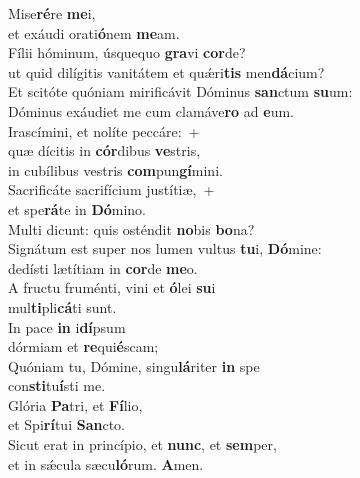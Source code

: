 \evenverse Mise\textbf{ré}re \textbf{me}i,~\*\\
\evenverse et exáudi orati\textbf{ó}nem \textbf{me}am.\\
\oddverse Fílii hóminum, úsquequo \textbf{gra}vi \textbf{cor}de?~\*\\
\oddverse ut quid dilígitis vanitátem et quǽri\textbf{tis} men\textbf{dá}cium?\\
\evenverse Et scitóte quóniam mirificávit Dóminus \textbf{san}ctum \textbf{su}um:~\*\\
\evenverse Dóminus exáudiet me cum clamáve\textbf{ro} ad \textbf{e}um.\\
\oddverse Irascímini, et nolíte peccáre:~+\\
\oddverse  quæ dícitis in \textbf{cór}dibus \textbf{ve}stris,~\*\\
\oddverse in cubílibus vestris \textbf{com}pun\textbf{gí}mini.\\
\evenverse Sacrificáte sacrifícium justítiæ,~+\\
\evenverse  et spe\textbf{rá}te in \textbf{Dó}mino.~\*\\
\evenverse Multi dicunt: quis osténdit \textbf{no}bis \textbf{bo}na?\\
\oddverse Signátum est super nos lumen vultus \textbf{tu}i, \textbf{Dó}mine:~\*\\
\oddverse dedísti lætítiam in \textbf{cor}de \textbf{me}o.\\
\evenverse A fructu fruménti, vini et \textbf{ó}lei \textbf{su}i~\*\\
\evenverse mul\textbf{ti}pli\textbf{cá}ti sunt.\\
\oddverse In pace \textbf{in} i\textbf{dí}psum~\*\\
\oddverse dórmiam et \textbf{re}qui\textbf{é}scam;\\
\evenverse Quóniam tu, Dómine, singu\textbf{lá}riter \textbf{in} spe~\*\\
\evenverse con\textbf{sti}tu\textbf{í}sti me.\\
\oddverse Glória \textbf{Pa}tri, et \textbf{Fí}lio,~\*\\
\oddverse et Spi\textbf{rí}tui \textbf{San}cto.\\
\evenverse Sicut erat in princípio, et \textbf{nunc}, et \textbf{sem}per,~\*\\
\evenverse et in sǽcula sæcu\textbf{ló}rum. \textbf{A}men.\\
